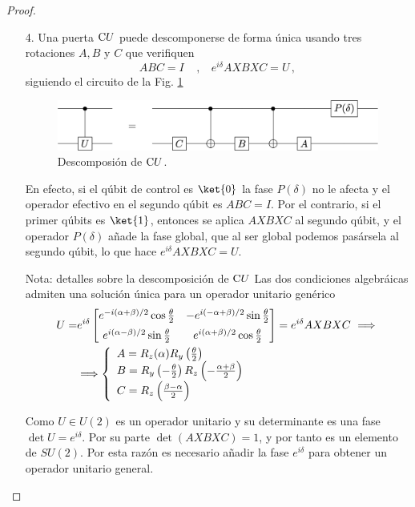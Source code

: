 \documentclass[a4paper,11pt]{book} %
\numberwithin{equation}{chapter}
\newcommand{\cg}[1]{{\rm C}#1}
\begin{document}
\begin{proof}
\begin{itemize}
		\item[4.] Una puerta $\cg{U}$ puede descomponerse de forma única usando tres rotaciones $A, B$ y $C$ que verifiquen
		\begin{equation}
		ABC = I ~~~~~,~~~~ e^{i\delta}  AXBXC = U\, ,
		\end{equation}
		siguiendo el circuito de la Fig. \ref{Fig_universal_CUdecomposition}
			\begin{figure}[H]
			\centering 
			\includegraphics[width=0.65\linewidth]{Figuras/Fig_universal_CUdecomposition.png}
			\caption{Descomposión de $\cg{U}$.}
			\label{Fig_universal_CUdecomposition}
			\end{figure}
		En efecto, si el qúbit de control es $\ket{0}$ la fase $P(\delta)$ no le afecta y el operador efectivo en el segundo 
		qúbit es $ABC= I$. Por el contrario, si el primer qúbits es $\ket{1}$, entonces se aplica $AXBXC$ al segundo qúbit, y 
		el operador $P(\delta)$ añade la fase global, que al ser global podemos pasársela al segundo qúbit, lo que hace 
		$e^{i\delta} AXBXC = U$.
		
		\begin{mybox_blue}{Nota: detalles sobre la descomposición de $\cg {U}$}
		Las dos condiciones  algebráicas admiten una solución única para un operador unitario genérico  
		\begin{align*}
		U = & e^{i\delta} 
		\begin{bmatrix} 
     		e^{-i(\alpha+\beta)/2} \cos\frac{\theta}{2}  &  - e^{i(-\alpha+\beta)/2}\sin\frac{\theta}{2}  \\  \rule{0mm}{5mm}
	    	e^{i(\alpha-\beta)/2}\sin\frac{\theta}{2}    &  e^{i(\alpha+\beta)/2}\cos\frac{\theta}{2}
		\end{bmatrix} 
		= e^{i\delta} AXBXC ~  \Longrightarrow ~ \\ \vspace{5mm}
		& \Longrightarrow 	
		\left\{ \begin{array}{l} 
			A = R_z(\alpha) R_y\left(\frac{\theta}{2}\right) \\ 
			B = R_y\left(-\frac{\theta}{2}\right) R_z\left(-\frac{\alpha + \beta}{2}\right) \\
			C = R_z\left( \frac{\beta-\alpha}{2}\right)
		\end{array} \right.
		\end{align*}				

		Como $U\in U(2)$  es un operador unitario y  su determinante es una fase $\det U = e^{i\delta}$. Por su parte 
		$\det(AXBXC) = 1$, y por tanto es un elemento de $SU(2)$.  Por esta razón es necesario añadir la fase $e^{i\delta}$ 
		para obtener un operador unitario general. 
		\end{mybox_blue}		
		
	\end{itemize}
	\end{proof}
\end{document}
